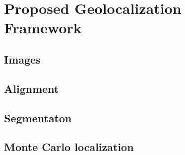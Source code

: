 \section{Proposed Geolocalization Framework}
\subsection{Images}
\subsection{Alignment}
\subsection{Segmentaton}
\subsection{Monte Carlo localization}
